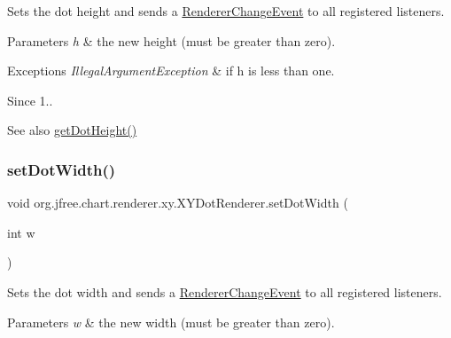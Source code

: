 Sets the dot height and sends a \mbox{\hyperlink{}{Renderer\+Change\+Event}} to all registered listeners.


\begin{DoxyParams}{Parameters}
{\em h} & the new height (must be greater than zero).\\
\hline
\end{DoxyParams}

\begin{DoxyExceptions}{Exceptions}
{\em Illegal\+Argument\+Exception} & if {\ttfamily h} is less than one.\\
\hline
\end{DoxyExceptions}
\begin{DoxySince}{Since}
1.. 
\end{DoxySince}
\begin{DoxySeeAlso}{See also}
\mbox{\hyperlink{classorg_1_1jfree_1_1chart_1_1renderer_1_1xy_1_1_x_y_dot_renderer_ab274478be9bf3d846732b90953e543b1}{get\+Dot\+Height()}} 
\end{DoxySeeAlso}
\mbox{\label{classorg_1_1jfree_1_1chart_1_1renderer_1_1xy_1_1_x_y_dot_renderer_a7c04419e31f770ce4ad7c59bb8ed6228}} 
\subsubsection{\texorpdfstring{set\+Dot\+Width()}{setDotWidth()}}
{\footnotesize\ttfamily void org.\+jfree.\+chart.\+renderer.\+xy.\+X\+Y\+Dot\+Renderer.\+set\+Dot\+Width (\begin{DoxyParamCaption}\item[{int}]{w }\end{DoxyParamCaption})}

Sets the dot width and sends a \mbox{\hyperlink{}{Renderer\+Change\+Event}} to all registered listeners.


\begin{DoxyParams}{Parameters}
{\em w} & the new width (must be greater than zero).\\
\hline
\end{DoxyParams}

